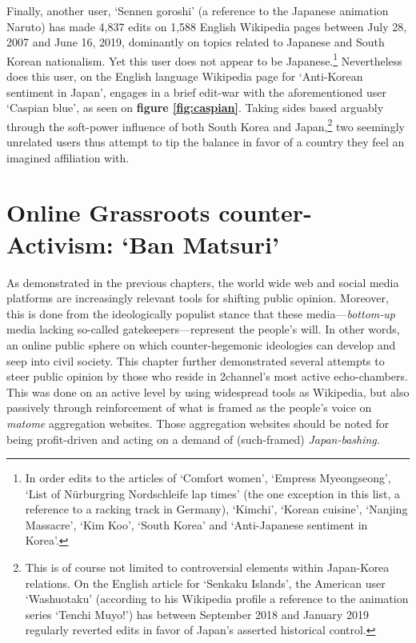 \documentclass[10pt,british,A4paper,twoside]{memoir}
\begin{document}
Finally, another user, `Sennen goroshi' (a reference to the Japanese
animation Naruto) has made 4,837 edits on 1,588 English Wikipedia pages
between July 28, 2007 and June 16, 2019, dominantly on topics related to
Japanese and South Korean nationalism. Yet this user does not appear to
be Japanese.\footnote{In order edits to the articles of `Comfort women',
  `Empress Myeongseong', `List of Nürburgring Nordschleife lap times'
  (the one exception in this list, a reference to a racking track in
  Germany), `Kimchi', `Korean cuisine', `Nanjing Massacre', `Kim Koo',
  `South Korea' and `Anti-Japanese sentiment in Korea'.} Nevertheless
does this user, on the English language Wikipedia page for `Anti-Korean
sentiment in Japan', engages in a brief edit-war with the aforementioned
user `Caspian blue', as seen on \textbf{figure \ref{fig:caspian}}.
Taking sides based arguably through the soft-power influence of both
South Korea and Japan,\footnote{This is of course not limited to
  controversial elements within Japan-Korea relations. On the English
  article for `Senkaku Islands', the American user `Washuotaku'
  (according to his Wikipedia profile a reference to the animation
  series `Tenchi Muyo!') has between September 2018 and January 2019
  regularly reverted edits in favor of Japan's asserted historical
  control.} two seemingly unrelated users thus attempt to tip the
balance in favor of a country they feel an imagined affiliation with.

\section{\texorpdfstring{Online Grassroots counter-Activism: `Ban
Matsuri'}{Online Grassroots counter-Activism: Ban Matsuri}}\label{online-grassroots-counter-activism-ban-matsuri}

As demonstrated in the previous chapters, the world wide web and social
media platforms are increasingly relevant tools for shifting public
opinion. Moreover, this is done from the ideologically populist stance
that these media---\emph{bottom-up} media lacking so-called
gatekeepers---represent the people's will. In other words, an online
public sphere on which counter-hegemonic ideologies can develop and seep
into civil society. This chapter further demonstrated several attempts
to steer public opinion by those who reside in 2channel's most active
echo-chambers. This was done on an active level by using widespread
tools as Wikipedia, but also passively through reinforcement of what is
framed as the people's voice on \emph{matome} aggregation websites.
Those aggregation websites should be noted for being profit-driven and
acting on a demand of (such-framed) \emph{Japan-bashing}.
\end{document}
